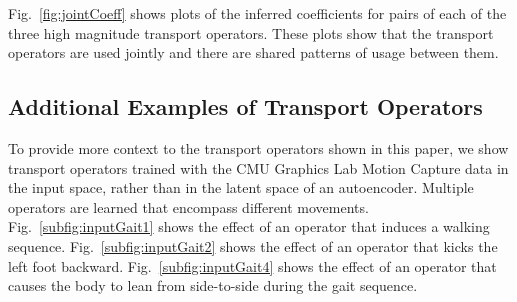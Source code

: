 \documentclass[letterpaper]{article} %
\begin{document}
Fig.~\ref{fig:jointCoeff} shows plots of the inferred coefficients for pairs of each of the three high magnitude transport operators. These plots show that the transport operators are used jointly and there are shared patterns of usage between them.


\subsection{Additional Examples of Transport Operators}\label{sec:exTO}
To provide more context to the transport operators shown in this paper, we show transport operators trained with the CMU Graphics Lab Motion Capture data in the input space, rather than in the latent space of an autoencoder. Multiple operators are learned that encompass different movements. Fig.~\ref{subfig:inputGait1} shows the effect of an operator that induces a walking sequence. Fig.~\ref{subfig:inputGait2} shows the effect of an operator that kicks the left foot backward. Fig.~\ref{subfig:inputGait4} shows the effect of an operator that causes the body to lean from side-to-side during the gait sequence.
\end{document}
